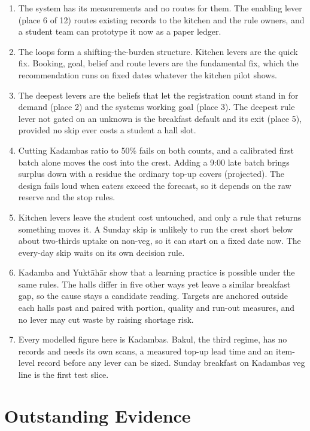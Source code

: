 \documentclass[
  10pt,
  table]{article}
\providecommand{\tightlist}{%
  \setlength{\itemsep}{0pt}\setlength{\parskip}{0pt}}
\renewcommand{\tightlist}{\setlength{\itemsep}{1.5pt}\setlength{\parskip}{0pt}}
\begin{document}
\begin{enumerate}
\def\labelenumi{\arabic{enumi}.}
\tightlist
\item
  The system has its measurements and no routes for them. The enabling lever (place 6 of 12) routes existing records to the kitchen and the rule owners, and a student team can prototype it now as a paper ledger.
\item
  The loops form a shifting-the-burden structure. Kitchen levers are the quick fix. Booking, goal, belief and route levers are the fundamental fix, which the recommendation runs on fixed dates whatever the kitchen pilot shows.
\item
  The deepest levers are the beliefs that let the registration count stand in for demand (place 2) and the system\textquotesingle s working goal (place 3). The deepest rule lever not gated on an unknown is the breakfast default and its exit (place 5), provided no skip ever costs a student a hall slot.
\item
  Cutting Kadamba\textquotesingle s ratio to 50\% fails on both counts, and a calibrated first batch alone moves the cost into the crest. Adding a 9:00 late batch brings surplus down with a residue the ordinary top-up covers (projected). The design fails loud when eaters exceed the forecast, so it depends on the raw reserve and the stop rules.
\item
  Kitchen levers leave the student cost untouched, and only a rule that returns something moves it. A Sunday skip is unlikely to run the crest short below about two-thirds uptake on non-veg, so it can start on a fixed date now. The every-day skip waits on its own decision rule.
\item
  Kadamba and Yuktāhār show that a learning practice is possible under the same rules. The halls differ in five other ways yet leave a similar breakfast gap, so the cause stays a candidate reading. Targets are anchored outside each hall\textquotesingle s past and paired with portion, quality and run-out measures, and no lever may cut waste by raising shortage risk.
\item
  Every modelled figure here is Kadamba\textquotesingle s. Bakul, the third regime, has no records and needs its own scans, a measured top-up lead time and an item-level record before any lever can be sized. Sunday breakfast on Kadamba\textquotesingle s veg line is the first test slice.
\end{enumerate}

\section{Outstanding Evidence}\label{outstanding-evidence}
\end{document}

